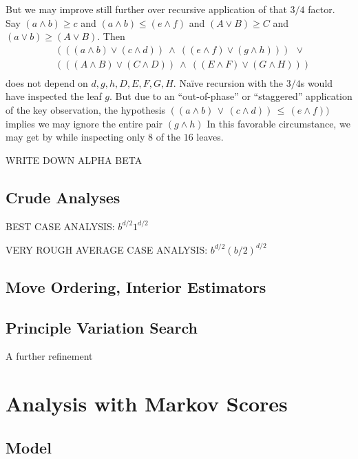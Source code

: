 \documentclass[12pt]{article}
\begin{document}
      But we may improve still further over recursive application of that $3/4$
      factor. 
      Say $(a\wedge b) \geq c$ and
          $(a\wedge b) \leq (e\wedge f)$ and
          $(A\vee B) \geq C$ and 
          $(a\vee b) \geq (A\vee B)$. 
      Then
      \begin{align*}
          &(((a\wedge b) \vee (c\wedge d)) ~\wedge~    
           ((e\wedge f) \vee (g\wedge h))) ~~\vee~~   \\
          &(((A\wedge B) \vee (C\wedge D)) ~\wedge~   
           ((E\wedge F) \vee (G\wedge H)))            \\ 
      \end{align*}
      does not depend on $d,g,h,D,E,F,G,H$.  Na\"ive recursion with the $3/4$s
      would have inspected the leaf $g$.  But due to an ``out-of-phase'' or
      ``staggered'' application of the key observation, the hypothesis 
      $
          ((a\!\wedge\!b)\,\vee\,(c\!\wedge\!d)) \,\leq\, (e\!\wedge\!f))
      $
      implies we may ignore the entire pair $(g\!\wedge\!h)$ 
      In this favorable circumstance, we may get by while inspecting only $8$
      of the $16$ leaves.  

      WRITE DOWN ALPHA BETA

    \subsection{Crude Analyses}

      BEST CASE ANALYSIS: $b^{d/2} 1^{d/2}$ 

      VERY ROUGH AVERAGE CASE ANALYSIS: $b^{d/2} (b/2)^{d/2}$ 

    \subsection{Move Ordering, Interior Estimators}

    \subsection{Principle Variation Search}

      A further refinement 

  \section{Analysis with Markov Scores}

    \subsection{Model}
\end{document}
